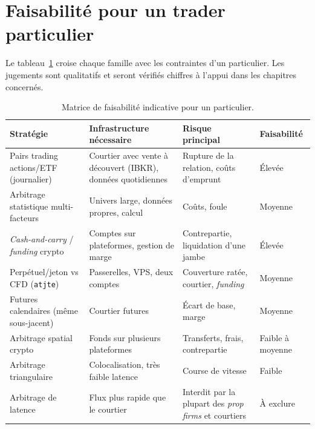 \section{Faisabilité pour un trader particulier}

Le tableau~\ref{c0:tab:feas} croise chaque famille avec les contraintes d'un particulier. Les jugements sont qualitatifs et seront vérifiés chiffres à l'appui dans les chapitres concernés.

\begin{table}[h]
\centering\small
\caption{Matrice de faisabilité indicative pour un particulier.}
\label{c0:tab:feas}
\begin{tabularx}{\textwidth}{>{\raggedright}p{3.0cm}>{\raggedright}X>{\raggedright}X>{\raggedright\arraybackslash}p{1.7cm}}
\toprule
Stratégie & Infrastructure nécessaire & Risque principal & Faisabilité \\
\midrule
Pairs trading actions/ETF (journalier) & Courtier avec vente à découvert (IBKR), données quotidiennes & Rupture de la relation, coûts d'emprunt & Élevée \\
Arbitrage statistique multi-facteurs & Univers large, données propres, calcul & Coûts, foule \citep{khandanilo2011} & Moyenne \\
\emph{Cash-and-carry} / \emph{funding} crypto & Comptes sur plateformes, gestion de marge & Contrepartie, liquidation d'une jambe & Élevée \\
Perpétuel/jeton vs CFD (\texttt{atjte}) & Passerelles, VPS, deux comptes & Couverture ratée, courtier, \emph{funding} & Moyenne \\
Futures calendaires (même sous-jacent) & Courtier futures & Écart de base, marge & Moyenne \\
Arbitrage spatial crypto & Fonds sur plusieurs plateformes & Transferts, frais, contrepartie & Faible à moyenne \\
Arbitrage triangulaire & Colocalisation, très faible latence & Course de vitesse \citep{budish2015} & Faible \\
Arbitrage de latence & Flux plus rapide que le courtier & Interdit par la plupart des \emph{prop firms} et courtiers & À exclure \\
\bottomrule
\end{tabularx}
\end{table}

